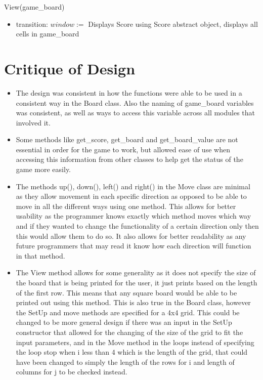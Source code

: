 \documentclass[12pt]{article}
\begin{document}
\noindent View(game\_board)

\begin{itemize}
\item transition: $\mathit{window} :=$ Displays Score using Score abstract object, displays all cells in game\_board

\end{itemize}

\newpage

\section* {Critique of Design}

\begin{itemize}

\item The design was consistent in how the functions were able to be used in a consistent way in the Board class. Also the
naming of game\_board variables was consistent, as well as ways to access this variable across all modules that involved it.

\item Some methods like get\_score, get\_board and get\_board\_value are not essential in order for the game to work, but allowed ease of use when accessing this information from other classes to help get the status of the game more easily. 

\item The methods up(), down(), left() and right() in the Move class are minimal as they allow movement in each specific direction as opposed to be able to move in all the different ways using one method. This allows for better usability as the programmer knows exactly which method moves which way and if they wanted to change the functionality of a certain direction only then this would allow them to do so. It also allows for better readability as any future programmers that may read it know how each direction will function in that method. 

\item The View method allows for some generality as it does not specify the size of the board that is being printed for the user, it just prints based on the length of the first row. This means that any square board would be able to be printed out using this method. This is also true in the Board class, however the SetUp and move methods are specified for a 4x4 grid. This could be changed to be more general design if there was an input in the SetUp constructor that allowed for the changing of the size of the grid to fit the input parameters, and in the Move method in the loops instead of specifying the loop stop when i less than 4 which is the length of the grid, that could have been changed to simply the length of the rows for i and length of columns for j to be checked instead. 


\end{itemize}
\end{document}
